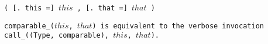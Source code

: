 
\s\tt{(} [\tt{. this =}]
$this$ \tt{,} [\tt{. that =}] $that$ \tt{)}


\tt{comparable_(}$this$\tt{,} $that$\tt{)} is equivalent to the
verbose invocation \tt{call_((Type, comparable),} $this$\tt{,} $that$\tt{)}.
